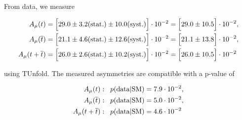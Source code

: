 
\newcommand{\AlResultCombined}{\ensuremath{\Big[26.0\pm 10.5 \Big]\cdot 10^{-2}}\xspace}
\newcommand{\AlResultCombinedStatSys}{\ensuremath{\Big[26.0\pm 2.6 \mathrm{(stat.)}\pm 10.2\mathrm{(syst.)} \Big] \cdot 10^{-2}} \xspace}
\newcommand{\AlResultCombinedPvalue}{\ensuremath{4.6\cdot 10^{-2}}\xspace}

\newcommand{\AlResultTop}{\ensuremath{\Big[29.0\pm 10.5 \Big]\cdot 10^{-2}}\xspace}
\newcommand{\AlResultTopStatSys}{\ensuremath{\Big[29.0 \pm 3.2 \mathrm{(stat.)} \pm 10.0\mathrm{(syst.)} \Big]\cdot 10^{-2}}\xspace}
\newcommand{\AlResultTopPvalue}{\ensuremath{7.9\cdot 10^{-2}}\xspace}

\newcommand{\AlResultAntiTop}{\ensuremath{\Big[21.1\pm 13.8 \Big]\cdot 10^{-2}}\xspace}
\newcommand{\AlResultAntiTopStatSys}{\ensuremath{\Big[21.1\pm 4.6\mathrm{(stat.)}\pm 12.6\mathrm{(syst.)} \Big]\cdot 10^{-2}}\xspace}
\newcommand{\AlResultAntiTopPvalue}{\ensuremath{5.0\cdot 10^{-2}}\xspace}


From data, we measure

\begin{align}
\AmuT          & = \AlResultTopStatSys = \AlResultTop , \\
\AmuTbar       & = \AlResultAntiTopStatSys = \AlResultAntiTop , \\
\AmuTplusTbar & = \AlResultCombinedStatSys = \AlResultCombined
\end{align}

using TUnfold. The measured asymmetries are compatible with a p-value of

\begin{align}
\AmuT:&\hspace{0.3cm} p(\mathrm{data |SM})          = \AlResultTopPvalue , \\
\AmuTbar:&\hspace{0.3cm} p(\mathrm{data |SM})      = \AlResultAntiTopPvalue , \\
\AmuTplusTbar:&\hspace{0.3cm} p(\mathrm{data |SM}) = \AlResultCombinedPvalue
\end{align}

